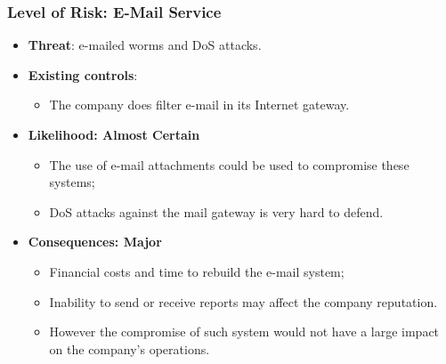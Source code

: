 \documentclass[xcolor ={table,usenames,dvipsnames}]{beamer}
\theoremstyle{definition}
\begin{document}
	\begin{frame}
		\frametitle{Level of Risk: E-Mail Service}
		\begin{itemize}
			\item \textbf{Threat}: e-mailed worms and DoS attacks.
			\item \textbf{Existing controls}: 
			\begin{itemize}
				\item The company does filter e-mail in its Internet gateway. 
			\end{itemize} 
			\item \textbf{Likelihood: Almost Certain}
			\begin{itemize}
				\item The use of e-mail attachments could be used to compromise these systems;
				\item DoS attacks against the mail gateway is very hard to defend.
			\end{itemize}	
			\item \textbf{Consequences: Major }
			\begin{itemize}
				\item Financial costs and time to rebuild the e-mail system;
				\item Inability to send or receive reports may affect the company reputation.
				\item However the compromise of such system would not have a large impact on the company's operations.
			\end{itemize}
		\end{itemize}
	\end{frame}
	
\end{document}
